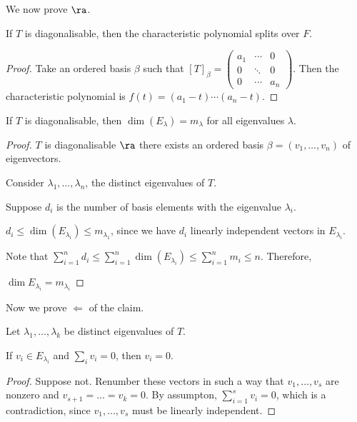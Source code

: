 \documentclass[11pt]{scrartcl}
\begin{document}
We now prove $\ra$.
\begin{theorem}
If $T$ is diagonalisable, then the characteristic polynomial splits over $F$.
\end{theorem}

\begin{proof}
Take an ordered basis $\beta$ such that $[T]_{\beta} = \begin{pmatrix}
a_{1} & \cdots & 0\\
0 & \ddots & 0\\
0 & \cdots & a_{n}
\end{pmatrix}$. Then the characteristic polynomial is $f(t) = (a_{1} - t)\cdots(a_n-t)$.
\end{proof}

\begin{theorem}
  If $T$ is diagonalisable, then $\dim(E_{\lambda}) = m_{\lambda}$ for
  all eigenvalues $\lambda$.
\end{theorem}

\begin{proof}
  $T$ is diagonalisable $\ra$ there exists an ordered basis
  $\beta = (v_{1}, \dots, v_n)$ of eigenvectors.

  Consider $\lambda_{1}, \dots, \lambda_n$, the distinct eigenvalues of $T$.

  Suppose $d_{i}$ is the number of basis elements with the eigenvalue
  $\lambda_{i}$.

  $d_{i} \leq \dim (E_{\lambda_{i}}) \leq m_{\lambda_1}$, since we have
  $d_{i}$ linearly independent vectors in $E_{\lambda_{i}}$.

  Note that $\sum_{i=1}^nd_i\leq \sum_{i=1}^n\dim(E_{\lambda_i})\leq \sum_{i=1}^nm_i \leq n$. Therefore,

  $\dim E_{\lambda_i}=m_{\lambda_i}$
\end{proof}

Now we prove $\Leftarrow$ of the claim.

\begin{lemma}
  Let $\lambda_{1}, \dots, \lambda_{k}$ be distinct eigenvalues of $T$.

  If $v_i\in E_{\lambda_i}$ and $\sum_iv_i = 0$, then $v_{i} = 0$.
\end{lemma}
\begin{proof}
  Suppose not.  Renumber these vectors in such a way that
  $v_1,\dots,v_s$ are nonzero and $v_{s+1}=\dots=v_k=0$. By assumpton,
  $\sum_{i=1}^sv_{i}=0$, which is a contradiction, since
  $v_{1}, \dots, v_{s}$ must be linearly independent.
\end{proof}
\end{document}
